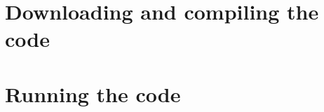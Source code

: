 \documentclass[10pt]{article}
\begin{document}
\section{Downloading and compiling the code}

\section{Running the code}
\end{document}
